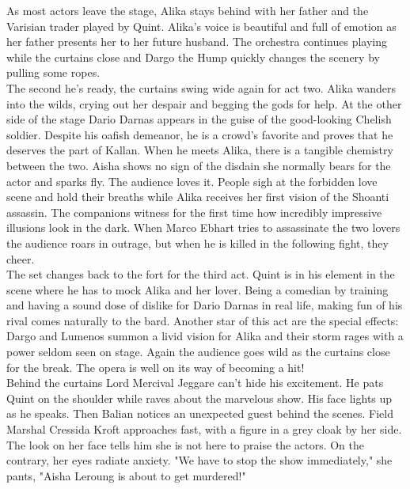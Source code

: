 As most actors leave the stage, Alika stays behind with her father and the Varisian trader played by Quint. Alika's voice is beautiful and full of emotion as her father presents her to her future husband. The orchestra continues playing while the curtains close and Dargo the Hump quickly changes the scenery by pulling some ropes.\\

The second he's ready, the curtains swing wide again for act two. Alika wanders into the wilds, crying out her despair and begging the gods for help. At the other side of the stage Dario Darnas appears in the guise of the good-looking Chelish soldier. Despite his oafish demeanor, he is a crowd's favorite and proves that he deserves the part of Kallan. When he meets Alika, there is a tangible chemistry between the two. Aisha shows no sign of the disdain she normally bears for the actor and sparks fly. The audience loves it. People sigh at the forbidden love scene and hold their breaths while Alika receives her first vision of the Shoanti assassin. The companions witness for the first time how incredibly impressive illusions look in the dark. When Marco Ebhart tries to assassinate the two lovers the audience roars in outrage, but when he is killed in the following fight, they cheer.\\

The set changes back to the fort for the third act. Quint is in his element in the scene where he has to mock Alika and her lover. Being a comedian by training and having a sound dose of dislike for Dario Darnas in real life, making fun of his rival comes naturally to the bard. Another star of this act are the special effects: Dargo and Lumenos summon a livid vision for Alika and their storm rages with a power seldom seen on stage. Again the audience goes wild as the curtains close for the break. The opera is well on its way of becoming a hit!\\

Behind the curtains Lord Mercival Jeggare can't hide his excitement. He pats Quint on the shoulder while raves about the marvelous show. His face lights up as he speaks. Then Balian notices an unexpected guest behind the scenes. Field Marshal Cressida Kroft approaches fast, with a figure in a grey cloak by her side. The look on her face tells him she is not here to praise the actors. On the contrary, her eyes radiate anxiety. "We have to stop the show immediately," she pants, "Aisha Leroung is about to get murdered!"\\

